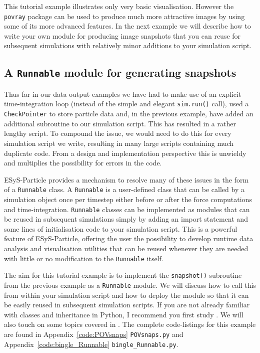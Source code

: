 This tutorial example illustrates only very basic visualisation. However the \texttt{povray} package can be used to produce much more attractive images by using some of its more advanced features. In the next example we will describe how to write your own module for producing image snapshots that you can reuse for subsequent simulations with relatively minor additions to your simulation script.

\subsection{A \texttt{Runnable} module for generating snapshots}

Thus far in our data output examples we have had to make use of an explicit time-integration loop (instead of the simple and elegant \texttt{sim.run()} call), used a \texttt{CheckPointer} to store particle data and, in the previous example, have added an additional subroutine to our simulation script. This has resulted in a rather lengthy script. To compound the issue, we would need to do this for every simulation script we write, resulting in many large scripts containing much duplicate code. From a design and implementation perspective this is unwieldy and multiplies the possibility for errors in the code. 

ESyS-Particle provides a mechanism to resolve many of these issues in the form of a \texttt{Runnable} class. A \texttt{Runnable} is a user-defined class that can be called by a simulation object once per timestep either before or after the force computations and time-integration. \texttt{Runnable} classes can be implemented as modules that can be reused in subsequent simulations simply by adding an import statement and some lines of initialisation code to your simulation script. This is a powerful feature of ESyS-Particle, offering the user the possibility to develop runtime data analysis and visualisation utilities that can be reused whenever they are needed with little or no modification to the \texttt{Runnable} itself.  

The aim for this tutorial example is to implement the \texttt{snapshot()} subroutine from the previous example as a \texttt{Runnable} module. We will discuss how to call this from within your simulation script and how to deploy the module so that it can be easily reused in subsequent simulation scripts. If you are not already familiar with classes and inheritance in Python, I recommend you first study . We will also touch on some topics covered in . The complete code-listings for this example are found in Appendix~\ref{code:POVsnaps} \texttt{POVsnaps.py} and Appendix~\ref{code:bingle_Runnable} \texttt{bingle\_Runnable.py}.

